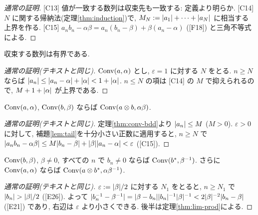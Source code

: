 \begin{lem}\label{lem:seq-aux}
\end{lem}
\begin{proof}[通常の証明]
  [C13] 値が一致する数列は収束先も一致する: 定義より明らか. [C14] $N$ に関する帰納法(定理\ref{thm:induction})で, $M_N := \lvert a_1\rvert + \cdots + \lvert a_N\rvert$ に相当する上界を作る. [C15] $a_n b_n - \alpha\beta = a_n(b_n - \beta) + \beta(a_n - \alpha)$ ([F18]) と三角不等式による.
\end{proof}

\begin{thm}\label{thm:conv-bdd}
  収束する数列は有界である.
\end{thm}
\begin{proof}[通常の証明(テキストと同じ)]
  $\mathrm{Conv}(a, \alpha)$ とし, $\varepsilon = 1$ に対する $N$ をとる. $n \geq N$ ならば $\lvert a_n\rvert \leq \lvert a_n - \alpha\rvert + \lvert \alpha\rvert < 1 + \lvert \alpha\rvert$. $n \leq N$ の項は [C14] の $M$ で抑えられるので, $M + 1 + \lvert \alpha\rvert$ が上界である.
\end{proof}

\begin{thm}\label{thm:lim-prod}
  $\mathrm{Conv}(a, \alpha)$, $\mathrm{Conv}(b, \beta)$ ならば $\mathrm{Conv}(a \otimes b, \alpha\beta)$.
\end{thm}
\begin{proof}[通常の証明(テキストと同じ)]
  定理\ref{thm:conv-bdd}より $\lvert a_n\rvert \leq M$ ($M > 0$). $\varepsilon > 0$ に対して, 補題\ref{lem:tail}を十分小さい正数に適用すると, $n \geq N$ で $\lvert a_n b_n - \alpha\beta\rvert \leq M\lvert b_n - \beta\rvert + \lvert \beta\rvert\lvert a_n - \alpha\rvert < \varepsilon$ ([C15]).
\end{proof}

\begin{thm}\label{thm:lim-quot}
  $\mathrm{Conv}(b, \beta)$, $\beta \neq 0$, すべての $n$ で $b_n \neq 0$ ならば $\mathrm{Conv}(b^{\ast}, \beta^{-1})$. さらに $\mathrm{Conv}(a, \alpha)$ ならば $\mathrm{Conv}(a \otimes b^{\ast}, \alpha\beta^{-1})$.
\end{thm}
\begin{proof}[通常の証明(テキストと同じ)]
  $\varepsilon := \lvert \beta\rvert/2$ に対する $N_1$ をとると, $n \geq N_1$ で $\lvert b_n\rvert > \lvert \beta\rvert/2$ ([E26]). よって $\lvert b_n^{-1} - \beta^{-1}\rvert = \lvert \beta - b_n\rvert\lvert b_n\rvert^{-1}\lvert \beta\rvert^{-1} < 2\lvert \beta\rvert^{-2}\lvert b_n - \beta\rvert$ ([E21]) であり, 右辺は $\varepsilon$ より小さくできる. 後半は定理\ref{thm:lim-prod}による.
\end{proof}

